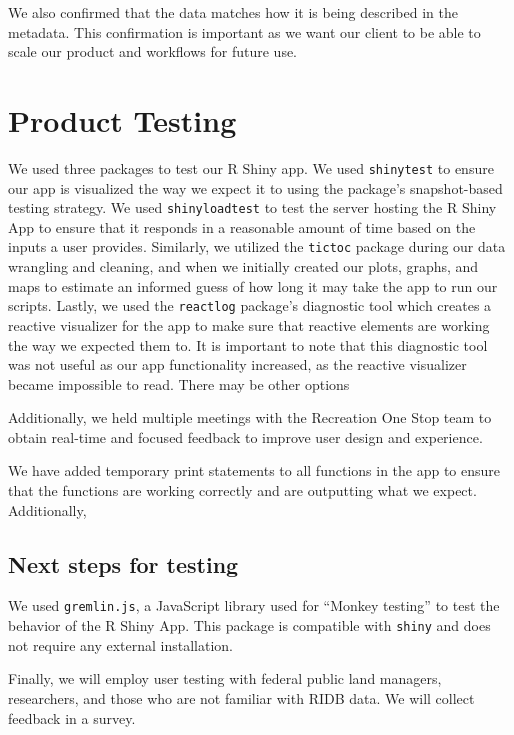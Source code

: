 \documentclass[
]{book}
\begin{document}
We also confirmed that the data matches how it is being described in the metadata. This confirmation is important as we want our client to be able to scale our product and workflows for future use.

\hypertarget{product-testing}{%
\section{Product Testing}\label{product-testing}}

We used three packages to test our R Shiny app. We used \texttt{shinytest} to ensure our app is visualized the way we expect it to using the package's snapshot-based testing strategy. We used \texttt{shinyloadtest} to test the server hosting the R Shiny App to ensure that it responds in a reasonable amount of time based on the inputs a user provides. Similarly, we utilized the \texttt{tictoc} package during our data wrangling and cleaning, and when we initially created our plots, graphs, and maps to estimate an informed guess of how long it may take the app to run our scripts. Lastly, we used the \texttt{reactlog} package's diagnostic tool which creates a reactive visualizer for the app to make sure that reactive elements are working the way we expected them to. It is important to note that this diagnostic tool was not useful as our app functionality increased, as the reactive visualizer became impossible to read. There may be other options

Additionally, we held multiple meetings with the Recreation One Stop team to obtain real-time and focused feedback to improve user design and experience.

We have added temporary print statements to all functions in the app to ensure that the functions are working correctly and are outputting what we expect. Additionally,

\hypertarget{next-steps-for-testing}{%
\subsection{Next steps for testing}\label{next-steps-for-testing}}

We used \texttt{gremlin.js}, a JavaScript library used for ``Monkey testing'' to test the behavior of the R Shiny App. This package is compatible with \texttt{shiny} and does not require any external installation.

Finally, we will employ user testing with federal public land managers, researchers, and those who are not familiar with RIDB data. We will collect feedback in a survey.
\end{document}
